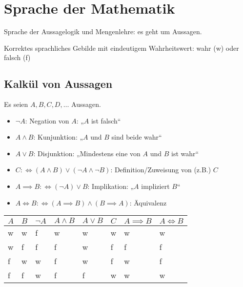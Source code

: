 
\chapter{Sprache der Mathematik}

Sprache der Aussagelogik und Mengenlehre: es geht um Aussagen.

\begin{definition}
  Korrektes sprachliches Gebilde mit eindeutigem Wahrheitswert: wahr (w) oder falsch (f)
\end{definition}

\section{Kalkül von Aussagen}
Es seien $A, B, C, D, \dots $ Aussagen.

\begin{itemize}
\item $\neg A$: Negation von $A$: „$A$ ist falsch“\index[sym]{$\neg$}
\item $A \wedge B$: Kunjunktion: „$A$ und $B$ sind beide wahr“\index[sym]{$\wedge$}
\item $A \vee B$: Disjunktion: „Mindestens eine von $A$ und $B$ ist wahr“\index[sym]{$\vee$}
\item $C :\iff (A \wedge B) \vee (\neg A \wedge \neg B)$: Definition/Zuweisung von (z.B.) $C$
\item $A \implies B :\iff (\neg A) \vee B$: Implikation: „$A$ impliziert $B$“\index[sym]{$\implies$}
\item $A \iff B :\iff (A \implies B) \wedge (B \implies A)$: Äquivalenz\index[sym]{$\iff$}
\end{itemize}

\begin{tabularx}{1.0\linewidth}{|X|X|X|X|X|X|X|X|}
  \hline
  $A$&$B$&$\neg A$&$A \wedge B$&$A \vee B$&$C$&$A \implies B$&$A \iff B$\\\hline
  w & w & f & w & w & w & w & w \\
  w & f & f & f & w & f & f & f \\
  f & w & w & f & w & f & w & f \\
  f & f & w & f & f & w & w & w \\\hline
\end{tabularx}

